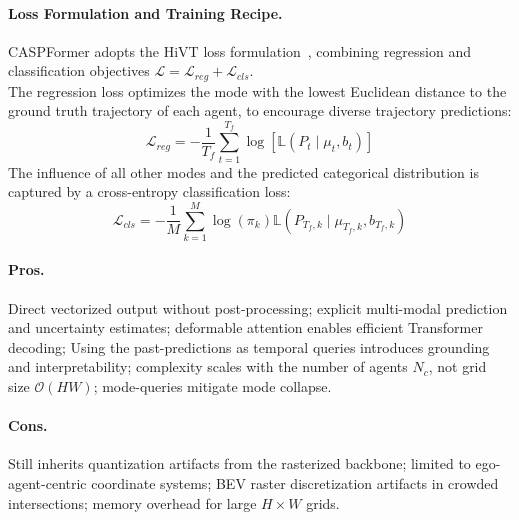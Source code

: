 \begin{description}[leftmargin=1em,itemsep=2pt]
\paragraph{Loss Formulation and Training Recipe.} CASPFormer adopts the HiVT loss formulation~\cite{zhou2022hivt}, combining regression and classification objectives \(\mathcal{L} = \mathcal{L}_{reg} + \mathcal{L}_{cls}\).\\
The regression loss optimizes the mode with the lowest Euclidean distance to the ground truth trajectory of each agent, to encourage diverse trajectory predictions:
\begin{equation}
  \label{eq:caspformer_regression_loss}
  \mathcal{L}_{reg} = -\frac{1}{T_f} \sum_{t=1}^{T_f} \log[\mathbb{L}(P_t \mid \mu_t, b_t)]
\end{equation}
The influence of all other modes and the predicted categorical distribution is captured by a cross-entropy classification loss:
\begin{equation}
  \label{eq:caspformer_classification_loss}
  \mathcal{L}_{cls} = -\frac{1}{M} \sum_{k=1}^{M} \log(\pi_k) \mathbb{L}(P_{T_f, k} \mid \mu_{T_f, k}, b_{T_f, k})
\end{equation}
\end{description}

\paragraph{Pros.} Direct vectorized output without post-processing; explicit multi-modal prediction and uncertainty estimates; deformable attention enables efficient Transformer decoding; Using the past-predictions as temporal queries introduces grounding and interpretability; complexity scales with the number of agents \( N_c \), not grid size \(\mathcal{O}(HW)\); mode-queries mitigate mode collapse.

\paragraph{Cons.} Still inherits quantization artifacts from the rasterized backbone; limited to ego-agent-centric coordinate systems; BEV raster discretization artifacts in crowded intersections; memory overhead for large \(H \times W\) grids.


